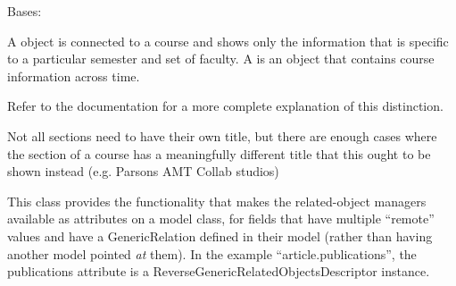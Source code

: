 \documentclass[letterpaper,10pt,english]{sphinxmanual}
\begin{document}
\begin{fulllineitems}
\label{generated/apps.profiles.models:apps.profiles.models.Section}
Bases: {\hyperref[generated/apps.profiles.models:apps.profiles.models.BaseModel]{}}

A  object is connected to a course and shows only the information
that is specific to a particular semester and set of faculty. A  is 
an object that contains course information across time.

Refer to the  documentation for a more complete explanation of this
distinction.


\begin{fulllineitems}
\label{generated/apps.profiles.models:apps.profiles.models.Section.get_display_title}
Not all sections need to have their own title, but there are enough cases
where the section of a course has a meaningfully different title that
this ought to be shown instead (e.g. Parsons AMT Collab studios)

\end{fulllineitems}



\begin{fulllineitems}
\label{generated/apps.profiles.models:apps.profiles.models.Section.unit_permissions}
This class provides the functionality that makes the related-object
managers available as attributes on a model class, for fields that have
multiple ``remote'' values and have a GenericRelation defined in their model
(rather than having another model pointed \emph{at} them). In the example
``article.publications'', the publications attribute is a
ReverseGenericRelatedObjectsDescriptor instance.

\end{fulllineitems}


\end{fulllineitems}


\end{document}
